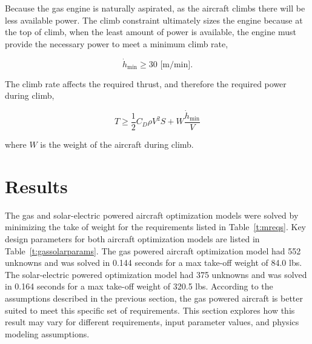 Because the gas engine is naturally aspirated, as the aircraft climbs there will be less available power.  
The climb constraint ultimately sizes the engine because at the top of climb, when the least amount of power is available, the engine must provide the necessary power to meet a minimum climb rate, 

\begin{equation}
    \label{e:climbrate}
    \dot{h}_{\text{min}} \geq 30 \text{ [m/min]}.
\end{equation}

The climb rate affects the required thrust, and therefore the required power during climb, 

\begin{equation}
    \label{e:climb}
    T \geq \frac{1}{2} C_D \rho V^2 S + W \frac{\dot{h}_{\text{min}}}{V}
\end{equation}

where $W$ is the weight of the aircraft during climb.  


\section{Results}

The gas and solar-electric powered aircraft optimization models were solved by minimizing the take of weight for the requirements listed in Table~\ref{t:mreqs}. 
Key design parameters for both aircraft optimization models are listed in Table~\ref{t:gassolarparams}.
The gas powered aircraft optimization model had 552 unknowns and was solved in 0.144 seconds for a max take-off weight of 84.0 lbs.  
The solar-electric powered optimization model had 375 unknowns and was solved in 0.164 seconds for a max take-off weight of 320.5 lbs.
According to the assumptions described in the previous section, the gas powered aircraft is better suited to meet this specific set of requirements. 
This section explores how this result may vary for different requirements, input parameter values, and physics modeling assumptions. 

